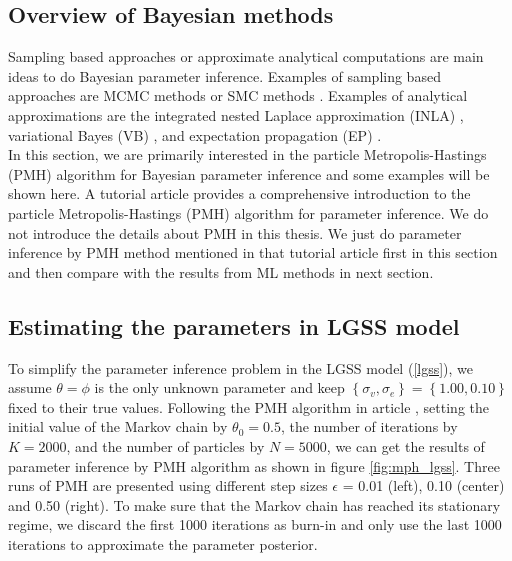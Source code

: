 \documentclass[mstat,12pt]{unswthesis}  %
\numberwithin{equation}{section}
\begin{document}
\subsection{Overview of Bayesian methods }
Sampling based approaches  or approximate
analytical computations are main ideas to do Bayesian parameter inference.
Examples of sampling based approaches are MCMC methods or SMC methods \cite{chopin2013smc2}.
Examples of analytical approximations are the integrated nested Laplace approximation (INLA) \cite{rue2009approximate}, variational Bayes (VB) \cite{bishop2006pattern},
and expectation propagation (EP) \cite{minka2013expectation}.\\

\noindent In this section, we are primarily interested in
 the particle Metropolis-Hastings
(PMH) algorithm for Bayesian parameter inference and some examples will be shown here. A tutorial article \cite{dahlin2019getting}  provides a comprehensive introduction to the particle Metropolis-Hastings (PMH) algorithm for parameter inference. We do not introduce the details about PMH in this thesis.
We just do parameter inference by PMH method mentioned in 
that tutorial article first in this section and
then compare with the results from ML methods in next section.\\

\subsection{Estimating the parameters in LGSS model}\label{section_lgss_inference}
To simplify the parameter inference problem in the LGSS model (\ref{lgss}), we assume $\theta=\phi$ is the only unknown parameter and keep $\left\{\sigma_{v}, \sigma_{e}\right\}=\left\{1.00,0.10\right\}$ fixed to
their true values. Following the PMH algorithm in article \cite{dahlin2019getting},  setting the initial value of
the Markov chain by $\theta_{0}=0.5$,  the number of iterations by $K=2000$, and the number of particles by $N=5000$, we can get the results of parameter inference by PMH algorithm as shown in 
figure \ref{fig:mph_lgss}.
Three runs of PMH are presented using different step sizes $\epsilon$ = 0.01 (left), 0.10
(center) and 0.50 (right).
To make sure that the Markov chain  has reached its stationary regime,
we discard the first 1000 iterations as burn-in and only use the
last 1000 iterations to approximate the parameter
posterior.\\
\end{document}
